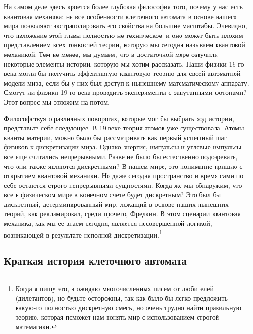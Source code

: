 \documentclass[main.tex]{subfiles}
\begin{document}
На самом деле здесь кроется более глубокая философия того, почему у нас есть квантовая механика: не все особенности клеточного автомата в основе нашего мира позволяют экстраполировать его свойства на большие масштабы. Очевидно, что изложение этой главы полностью не техническое, и оно может быть плохим представлением всех тонкостей теории, которую мы сегодня называем квантовой механикой. Тем не менее, мы думаем, что в достаточной мере озвучили некоторые элементы истории, которую мы хотим рассказать. Наши физики 19-го века могли бы получить эффективную квантовую теорию для своей автоматной модели мира, если бы у них был доступ к нынешнему математическому аппарату. Смогут ли физики 19-го века проводить эксперименты с запутанными фотонами? Этот вопрос мы отложим на потом. 

Философствуя о различных поворотах, которые мог бы выбрать ход истории, представьте себе следующее. В 19 веке теория атомов уже существовала. Атомы - кванты материи, можно было бы рассматривать как первый успешный шаг физиков к дискретизации мира. Однако энергия, импульсы и угловые импульсы все еще считались непрерывными. Разве не было бы естественно подозревать, что они также являются дискретными? В нашем мире, это понимание пришло с открытием квантовой механики. 
Но даже сегодня пространство и время сами по себе остаются строго непрерывными сущностями. Когда же мы обнаружим, что все в физическом мире в конечном счете будет дискретным? Это был бы дискретный, детерминированный мир, лежащий в основе наших нынешних теорий, как рекламировал, среди прочего, Фредкин. В этом сценарии квантовая механика, как мы ее знаем сегодня, является несовершенной логикой, возникающей в результате неполной дискретизации.\footnote{Когда я пишу это, я ожидаю многочисленных писем от любителей (дилетантов), но будьте осторожны, так как было бы легко предложить какую-то полностью дискретную смесь, но очень трудно найти правильную теорию, которая поможет нам понять мир с использованием строгой математики.}

\subsection{Краткая история клеточного автомата}\label{ch1.4}
\end{document}
